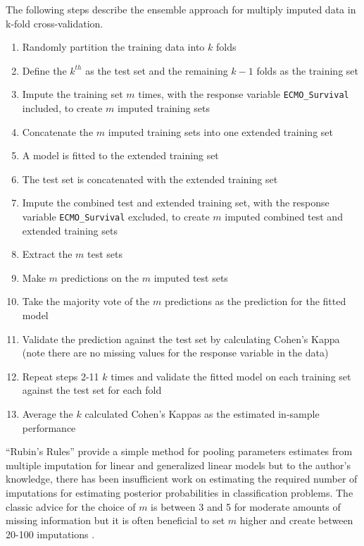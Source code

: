 \documentclass[12pt,]{article}
\providecommand{\tightlist}{%
  \setlength{\itemsep}{0pt}\setlength{\parskip}{0pt}}
\begin{document}
The following steps describe the ensemble approach for multiply imputed
data in k-fold cross-validation.

\begin{enumerate}
\def\labelenumi{\arabic{enumi}.}
\tightlist
\item
  Randomly partition the training data into \(k\) folds
\item
  Define the \(k^{th}\) as the test set and the remaining \(k-1\) folds
  as the training set
\item
  Impute the training set \(m\) times, with the response variable
  \texttt{ECMO\_Survival} included, to create \(m\) imputed training
  sets
\item
  Concatenate the \(m\) imputed training sets into one extended training
  set
\item
  A model is fitted to the extended training set
\item
  The test set is concatenated with the extended training set
\item
  Impute the combined test and extended training set, with the response
  variable \texttt{ECMO\_Survival} excluded, to create \(m\) imputed
  combined test and extended training sets
\item
  Extract the \(m\) test sets
\item
  Make \(m\) predictions on the \(m\) imputed test sets
\item
  Take the majority vote of the \(m\) predictions as the prediction for
  the fitted model
\item
  Validate the prediction against the test set by calculating Cohen's
  Kappa (note there are no missing values for the response variable in
  the data)
\item
  Repeat steps 2-11 \(k\) times and validate the fitted model on each
  training set against the test set for each fold
\item
  Average the \(k\) calculated Cohen's Kappas as the estimated in-sample
  performance
\end{enumerate}

``Rubin's Rules'' \citep{rubin_inference_1976} provide a simple method
for pooling parameters estimates from multiple imputation for linear and
generalized linear models but to the author's knowledge, there has been
insufficient work on estimating the required number of imputations for
estimating posterior probabilities in classification problems. The
classic advice for the choice of \(m\) is between 3 and 5 for moderate
amounts of missing information but it is often beneficial to set \(m\)
higher and create between 20-100 imputations
\citep{van_buuren_flexible_2012}.
\end{document}

